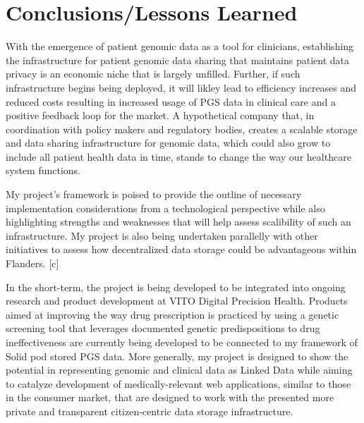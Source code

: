 \documentclass[runningheads]{llncs}
\begin{document}
\section{Conclusions/Lessons Learned}

With the emergence of patient genomic data as a tool for clinicians, establishing the infrastructure for patient genomic data sharing that maintains patient data privacy is an economic niche that is largely unfilled. 
Further, if such infrastructure begins being deployed, it will likley lead to efficiency increases and reduced costs resulting in increased usage of PGS data in clinical care and a positive feedback loop for the market.
A hypothetical company that, in coordination with policy makers and regulatory bodies, creates a scalable storage and data sharing infrastructure for genomic data, which could also grow to include all patient health data in time, stands to change the way our healthcare system functions. 

My project's framework is poised to provide the outline of necessary implementation considerations from a technological perspective while also highlighting strengths and weaknesses that will help assess scalibility of such an infrastructure. 
My project is also being undertaken parallelly with other initiatives to assess how decentralized data storage could be advantageous within Flanders. [c]

In the short-term, the project is being developed to be integrated into ongoing research and product development at VITO Digital Precision Health. 
Products aimed at improving the way drug prescription is practiced by using a genetic screening tool that leverages documented genetic predispositions to drug ineffectiveness are currently being developed to be connected to my framework of Solid pod stored PGS data. 
More generally, my project is designed to show the potential in representing genomic and clinical data as Linked Data while aiming to catalyze  development of medically-relevant web applications, similar to those in the consumer market, that are designed to work with the presented more private and transparent citizen-centric data storage infrastructure.
\end{document}

